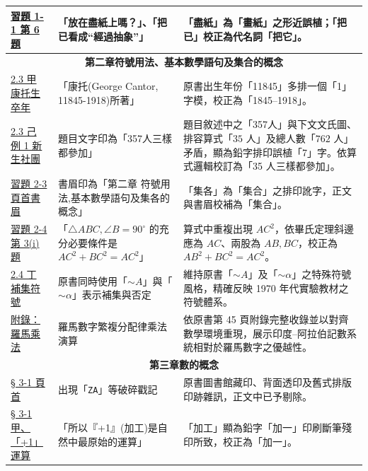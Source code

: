 \documentclass[a4paper,12pt,twoside]{article}
\begin{document}
\begin{table}[H]
\begin{tabularx}{\textwidth}{|p{3.0cm}|p{3.8cm}|X|}
\hyperref[sec:ex1-1]{習題 1-1 第 6 題} & 
「放在盡紙上嗎？」、「把已看成“經過抽象”」 & 
「盡紙」為「畫紙」之形近誤植；「把已」校正為代名詞「把它」。 \\ \hline

\multicolumn{3}{|c|}{\textbf{第二章\quad 符號用法、基本數學語句及集合的概念}} \\ \hline

\hyperref[subsec:2-3-a]{2.3 甲 康托生卒年} & 
「康托(George Cantor, 11845-1918)所著」 & 
原書出生年份「11845」多排一個「1」字模，校正為「1845--1918」。 \\ \hline

\hyperref[subsec:2-3-f]{2.3 己 例 1 新生社團} & 
題目文字印為「357人三樣都參加」 & 
題目敘述中之「357人」與下文文氏圖、排容算式「$35$ 人」及總人數「$762$ 人」矛盾，顯為鉛字排印誤植「7」字。依算式邏輯校訂為「35 人三樣都參加」。 \\ \hline

\hyperref[sec:ex2-3]{習題 2-3 頁首書眉} & 
書眉印為「第二章 符號用法,基本數學語句及集各的概念」 & 
「集各」為「集合」之排印訛字，正文與書眉校補為「集合」。 \\ \hline

\hyperref[sec:ex2-4]{習題 2-4 第 3(i) 題} & 
「$\triangle ABC, \angle B=90^\circ$ 的充分必要條件是 $AC^2+BC^2=AC^2$」 & 
算式中重複出現 $AC^2$，依畢氏定理斜邊應為 $AC$、兩股為 $AB, BC$，校正為 $AB^2+BC^2=AC^2$。 \\ \hline

\hyperref[subsec:2-4-d]{2.4 丁 補集符號} & 
原書同時使用「$\sim A$」與「$\sim \alpha$」表示補集與否定 & 
維持原書「$\sim A$」及「$\sim \alpha$」之特殊符號風格，精確反映 1970 年代實驗教材之符號體系。 \\ \hline

\hyperref[sec:ch2-appendix]{附錄：羅馬乘法} & 
羅馬數字繁複分配律乘法演算 & 
依原書第 45 頁附錄完整收錄並以對齊數學環境重現，展示印度--阿拉伯記數系統相對於羅馬數字之優越性。 \\ \hline

\multicolumn{3}{|c|}{\textbf{第三章\quad 數的概念}} \\ \hline

\hyperref[sec:3-1]{§ 3-1 頁首} & 
出現「\texttt{ZA}」等破碎戳記 & 
原書圖書館藏印、背面透印及舊式排版印跡雜訊，正文中已予剔除。 \\ \hline

\hyperref[subsec:plus_one]{§ 3-1 甲、「+1」運算} & 
「所以『+1』(加工)是自然中最原始的運算」 & 
「加工」顯為鉛字「加一」印刷斷筆殘印所致，校正為「加一」。 \\ \hline


\end{tabularx}
\end{table}
\end{document}
